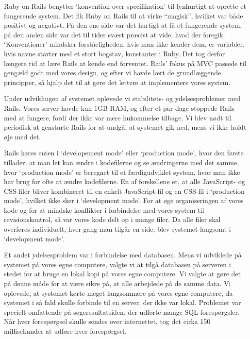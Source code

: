 Ruby on Rails benytter `konvention over specifikation' til lynhurtigt at oprette et fungerende system. Det fik Ruby on Rails til at virke ``magisk'', hvilket var både positivt og negativt. På den ene side var det hurtigt at få et fungerende system, på den anden side var det til tider svært præcist at vide, hvad der foregik. `Konventioner' mindsker forståeligheden, hvis man ikke kender dem, \fx er variabler, hvis navne starter med et stort bogstav, konstanter i Ruby. Det tog derfor længere tid at lære Rails at kende end forventet. 
Rails' fokus på MVC passede til gengæld godt med vores design, og efter vi havde lært de grundlæggende principper, så hjalp det til at gøre det lettere at implementere vores system.

Under udviklingen af systemet oplevede vi stabilitets- og ydelsesproblemer med Rails. Vores server havde kun 1GB RAM, og efter et par dage stoppede Rails med at fungere, fordi der ikke var mere hukommelse tilbage. Vi blev nødt til periodisk at genstarte Rails for at undgå, at systemet gik ned, mens vi ikke holdt øje med det.

Rails køres enten i `developement mode' eller `production mode', hvor den første tillader, at man let kan ændre i kodefilerne og se ændringerne med det samme, hvor `production mode' er beregnet til et færdigudviklet system, hvor man ikke har brug for ofte at ændre kodefilerne. En af forskellene er, at alle JavaScript- og CSS-filer bliver kombineret til en enkelt JavaScript-fil og en CSS-fil i `production mode', hvilket ikke sker i `development mode'. For at øge organiseringen af vores kode og for at mindske konflikter i forbindelse med vores system til revisionskontrol, så var vores kode delt op i mange filer. Da alle filer skal overføres individuelt, hver gang man tilgår en side, blev systemet langsomt i `development mode'.

Et andet ydelsesproblem var i forbindelse med databasen. Mens vi udviklede på systemet på vores egne computere, valgte vi at tilgå databasen på serveren i stedet for at bruge en lokal kopi på vores egne computere. Vi valgte at gøre det på denne måde for at være sikre på, at alle arbejdede på de samme data. Vi oplevede, at systemet kørte meget langsommere på vores egne computere, da systemet i så fald skulle forbinde til en server, der ikke var lokal. Problemet var specielt omfattende på søgeresultatsiden, der udførte mange SQL-forespørgsler. Når hver forespørgsel skulle sendes over internettet, tog det cirka 150 millisekunder at udføre hver forespørgsel.

